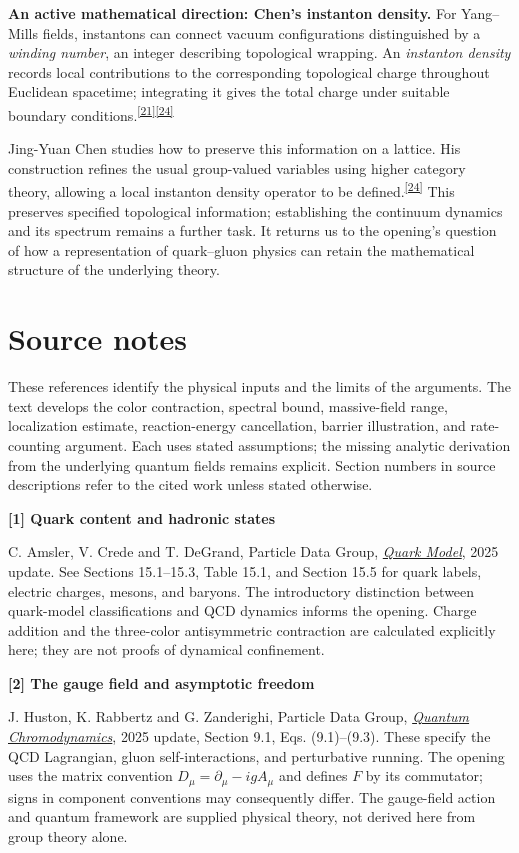 \documentclass[11pt]{article}
\newcommand{\refn}[1]{\textsuperscript{\hyperlink{src#1}{[#1]}}}
\newcommand{\source}[3]{\par\medskip\hypertarget{src#1}{}\textbf{[#1] #2}\par\nopagebreak #3\par}
\begin{document}
\textbf{An active mathematical direction: Chen's instanton density.}
For Yang--Mills fields, instantons can connect vacuum configurations
distinguished by a \emph{winding number}, an integer describing topological
wrapping. An \emph{instanton density} records local contributions to the
corresponding topological charge throughout Euclidean spacetime; integrating
it gives the total charge under suitable boundary conditions.\refn{21}\refn{24}

Jing-Yuan Chen studies how to preserve this information on a lattice. His construction refines the usual group-valued variables using higher category theory, allowing a local instanton density operator to be defined.\refn{24} This preserves specified topological information; establishing the continuum dynamics and its spectrum remains a further task. It returns us to the opening's question of how a representation of quark--gluon physics can retain the mathematical structure of the underlying theory.

\section*{Source notes}
\small
These references identify the physical inputs and the limits of the arguments. The text develops the color contraction, spectral bound, massive-field range, localization estimate, reaction-energy cancellation, barrier illustration, and rate-counting argument. Each uses stated assumptions; the missing analytic derivation from the underlying quantum fields remains explicit. Section numbers in source descriptions refer to the cited work unless stated otherwise.

\source{1}{Quark content and hadronic states}{C. Amsler, V. Crede and T. DeGrand, Particle Data Group, \href{https://pdg.lbl.gov/2025/reviews/rpp2025-rev-quark-model.pdf}{\emph{Quark Model}}, 2025 update. See Sections 15.1--15.3, Table 15.1, and Section 15.5 for quark labels, electric charges, mesons, and baryons. The introductory distinction between quark-model classifications and QCD dynamics informs the opening. Charge addition and the three-color antisymmetric contraction are calculated explicitly here; they are not proofs of dynamical confinement.}

\source{2}{The gauge field and asymptotic freedom}{J. Huston, K. Rabbertz and G. Zanderighi, Particle Data Group, \href{https://pdg.lbl.gov/2025/reviews/rpp2025-rev-qcd.pdf}{\emph{Quantum Chromodynamics}}, 2025 update, Section 9.1, Eqs. (9.1)--(9.3). These specify the QCD Lagrangian, gluon self-interactions, and perturbative running. The opening uses the matrix convention $D_\mu=\partial_\mu-igA_\mu$ and defines $F$ by its commutator; signs in component conventions may consequently differ. The gauge-field action and quantum framework are supplied physical theory, not derived here from group theory alone.}
\end{document}
